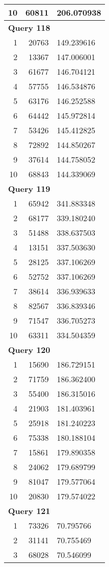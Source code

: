 \begin{longtable}[{p}]{@{}rrp{}@{}}
10 & 60811 & 206.070938 \\
\midrule
\multicolumn{3}{l}{\bfseries Query 118} \\
1 & 20763 & 149.239616 \\
2 & 13367 & 147.006001 \\
3 & 61677 & 146.704121 \\
4 & 57755 & 146.534876 \\
5 & 63176 & 146.252588 \\
6 & 64442 & 145.972814 \\
7 & 53426 & 145.412825 \\
8 & 72892 & 144.850267 \\
9 & 37614 & 144.758052 \\
10 & 68843 & 144.339069 \\
\midrule
\multicolumn{3}{l}{\bfseries Query 119} \\
1 & 65942 & 341.883348 \\
2 & 68177 & 339.180240 \\
3 & 51488 & 338.637503 \\
4 & 13151 & 337.503630 \\
5 & 28125 & 337.106269 \\
6 & 52752 & 337.106269 \\
7 & 38614 & 336.939633 \\
8 & 82567 & 336.839346 \\
9 & 71547 & 336.705273 \\
10 & 63311 & 334.504359 \\
\midrule
\multicolumn{3}{l}{\bfseries Query 120} \\
1 & 15690 & 186.729151 \\
2 & 71759 & 186.362400 \\
3 & 55400 & 186.315016 \\
4 & 21903 & 181.403961 \\
5 & 25918 & 181.240223 \\
6 & 75338 & 180.188104 \\
7 & 15861 & 179.890358 \\
8 & 24062 & 179.689799 \\
9 & 81047 & 179.577064 \\
10 & 20830 & 179.574022 \\
\midrule
\multicolumn{3}{l}{\bfseries Query 121} \\
1 & 73326 & 70.795766 \\
2 & 31141 & 70.755469 \\
3 & 68028 & 70.546099 \\

\end{longtable}
